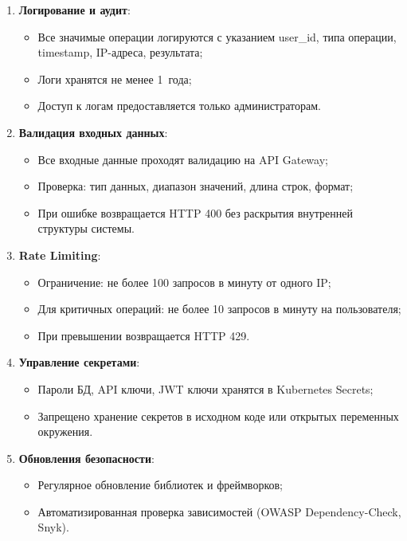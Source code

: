 \documentclass{bmstu}
\begin{document}
\begin{enumerate}
    \item \textbf{Логирование и аудит}:
    \begin{itemize}
        \item Все значимые операции логируются с указанием user\_id, типа операции, timestamp, IP-адреса, результата;
        \item Логи хранятся не менее 1~года;
        \item Доступ к логам предоставляется только администраторам.
    \end{itemize}
    
    \item \textbf{Валидация входных данных}:
    \begin{itemize}
        \item Все входные данные проходят валидацию на API Gateway;
        \item Проверка: тип данных, диапазон значений, длина строк, формат;
        \item При ошибке возвращается HTTP 400 без раскрытия внутренней структуры системы.
    \end{itemize}
    
    \item \textbf{Rate Limiting}:
    \begin{itemize}
        \item Ограничение: не более 100 запросов в минуту от одного IP;
        \item Для критичных операций: не более 10 запросов в минуту на пользователя;
        \item При превышении возвращается HTTP 429.
    \end{itemize}
    
    \item \textbf{Управление секретами}:
    \begin{itemize}
        \item Пароли БД, API ключи, JWT ключи хранятся в Kubernetes Secrets;
        \item Запрещено хранение секретов в исходном коде или открытых переменных окружения.
    \end{itemize}
    
    \item \textbf{Обновления безопасности}:
    \begin{itemize}
        \item Регулярное обновление библиотек и фреймворков;
        \item Автоматизированная проверка зависимостей (OWASP Dependency-Check, Snyk).
    \end{itemize}
\end{enumerate}
\end{document}

